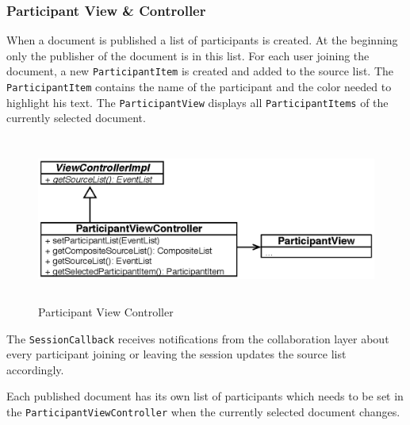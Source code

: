
\subsubsection{Participant View \& Controller}
When a document is published a list of participants is created. At the beginning only the publisher of the document is in this list. For each user joining the document, a new \texttt{Participant\-Item} is created and added to the source list. The \texttt{Participant\-Item} contains the name of the participant and the color needed to highlight his text. The \texttt{Participant\-View} displays all \texttt{Participant\-Items} of the currently selected document.

\begin{figure}[H]
\begin{center}
  \includegraphics[height=2.15in, width=5.62in]{../images/finalreport/application_participantview.eps}
\caption{Participant View Controller}
\label{application_participantview}
\end{center}
\end{figure}

The \texttt{Session\-Callback} receives notifications from the collaboration layer about every participant joining or leaving the session updates the source list accordingly.

Each published document has its own list of participants which needs to be set in the \texttt{Participant\-View\-Controller} when the currently selected document changes.


